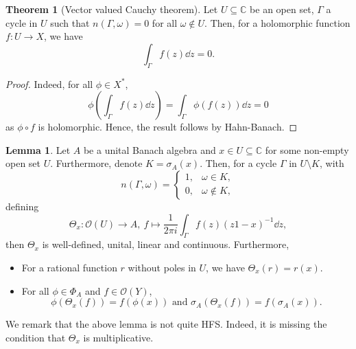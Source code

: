 \documentclass[]{article}
\theoremstyle{definition}
\newtheorem{theorem}{Theorem}
\newtheorem{lemma}{Lemma}[section]
\begin{document}
\begin{theorem}[Vector valued Cauchy theorem]
  Let \(U \subseteq \mathbb{C}\) be an open set, \(\Gamma\) a cycle in \(U\) such that 
  \(n(\Gamma, \omega) = 0\) for all \(\omega \not\in U\). Then, for a holomorphic function 
  \(f : U \to X\), we have 
  \[\int_\Gamma f(z) \dd z = 0.\]
\end{theorem}
\begin{proof}
  Indeed, for all \(\phi \in X^*\), 
  \[\phi\left(\int_\Gamma f(z) \dd z\right) = \int_\Gamma \phi(f(z)) \dd z = 0\]
  as \(\phi \circ f\) is holomorphic. Hence, the result follows by Hahn-Banach.
\end{proof}

\begin{lemma}
  Let \(A\) be a unital Banach algebra and \(x \in U \subseteq \mathbb{C}\) for some non-empty open 
  set \(U\). Furthermore, denote \(K = \sigma_A(x)\). Then, for a cycle \(\Gamma\) in \(U \setminus K\), 
  with 
  \[n(\Gamma, \omega) =
    \begin{cases}
    1, & \omega \in K,\\
    0, & \omega \not\in K,
  \end{cases}\]
  defining 
  \[\Theta_x : \mathcal{O}(U) \to A,\ f \mapsto \frac{1}{2\pi i} \int_\Gamma f(z)(z1 - x)^{-1} \dd z,\]
  then \(\Theta_x\) is well-defined, unital, linear and continuous. Furthermore, 
  \begin{itemize}
    \item For a rational function \(r\) without poles in \(U\), we have \(\Theta_x(r) = r(x)\). 
    \item For all \(\phi \in \Phi_A\) and \(f \in \mathcal{O}(Y)\), 
      \[\phi(\Theta_x(f)) = f(\phi(x)) \text{ and } \sigma_A(\Theta_x(f)) = f(\sigma_A(x)).\] 
  \end{itemize}
\end{lemma}

We remark that the above lemma is not quite HFS. Indeed, it is missing the condition that \(\Theta_x\) 
is multiplicative.
\end{document}
